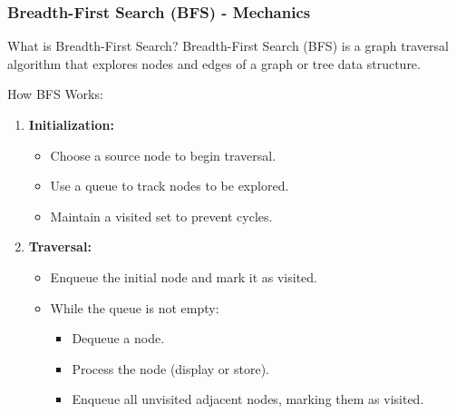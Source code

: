 \documentclass[aspectratio=169]{beamer}
\begin{document}
\begin{frame}[fragile]
    \frametitle{Breadth-First Search (BFS) - Mechanics}
    \begin{block}{What is Breadth-First Search?}
        Breadth-First Search (BFS) is a graph traversal algorithm that explores nodes and edges of a graph or tree data structure.
    \end{block}
    
    \begin{block}{How BFS Works:}
        \begin{enumerate}
            \item \textbf{Initialization:}
            \begin{itemize}
                \item Choose a source node to begin traversal.
                \item Use a queue to track nodes to be explored.
                \item Maintain a visited set to prevent cycles.
            \end{itemize}
            
            \item \textbf{Traversal:}
            \begin{itemize}
                \item Enqueue the initial node and mark it as visited.
                \item While the queue is not empty:
                    \begin{itemize}
                        \item Dequeue a node.
                        \item Process the node (display or store).
                        \item Enqueue all unvisited adjacent nodes, marking them as visited.
                    \end{itemize}
            \end{itemize}
        \end{enumerate}
    \end{block}
\end{frame}
\end{document}

